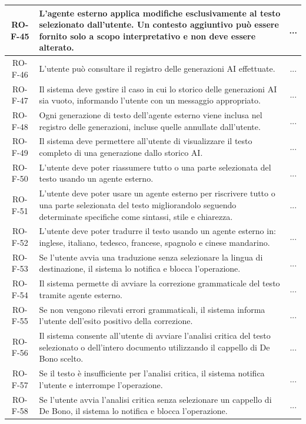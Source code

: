 \documentclass[11pt,a4paper]{article}
\begin{document}
\begin{longtable}{|c|p{11cm}|c|}
\hline
RO-F-45 & L'agente esterno applica modifiche esclusivamente al testo selezionato dall'utente. Un contesto aggiuntivo può essere fornito solo a scopo interpretativo e non deve essere alterato. & ... \\
\hline
RO-F-46 & L'utente può consultare il registro delle generazioni AI effettuate. & ... \\
\hline
RO-F-47 & Il sistema deve gestire il caso in cui lo storico delle generazioni AI sia vuoto, informando l'utente con un messaggio appropriato. & ... \\
\hline
RO-F-48 & Ogni generazione di testo dell'agente esterno viene inclusa nel registro delle generazioni, incluse quelle annullate dall'utente. & ... \\
\hline
RO-F-49 & Il sistema deve permettere all'utente di visualizzare il testo completo di una generazione dallo storico AI. & ... \\
\hline
RO-F-50 & L'utente deve poter riassumere tutto o una parte selezionata del testo usando un agente esterno. & ... \\
\hline
RO-F-51 & L'utente deve poter usare un agente esterno per riscrivere tutto o una parte selezionata del testo migliorandolo seguendo determinate specifiche come sintassi, stile e chiarezza. & ... \\
\hline
RO-F-52 & L'utente deve poter tradurre il testo usando un agente esterno in: inglese, italiano, tedesco, francese, spagnolo e cinese mandarino. & ... \\
\hline
RO-F-53 & Se l'utente avvia una traduzione senza selezionare la lingua di destinazione, il sistema lo notifica e blocca l'operazione. & ... \\
\hline
RO-F-54 & Il sistema permette di avviare la correzione grammaticale del testo tramite agente esterno. & ... \\
\hline
RO-F-55 & Se non vengono rilevati errori grammaticali, il sistema informa l'utente dell'esito positivo della correzione. & ... \\
\hline
RO-F-56 & Il sistema consente all'utente di avviare l'analisi critica del testo selezionato o dell'intero documento utilizzando il cappello di De Bono scelto. & ... \\
\hline
RO-F-57 & Se il testo è insufficiente per l'analisi critica, il sistema notifica l'utente e interrompe l'operazione. & ... \\
\hline
RO-F-58 & Se l'utente avvia l'analisi critica senza selezionare un cappello di De Bono, il sistema lo notifica e blocca l'operazione. & ... \\

\end{longtable}
\end{document}
